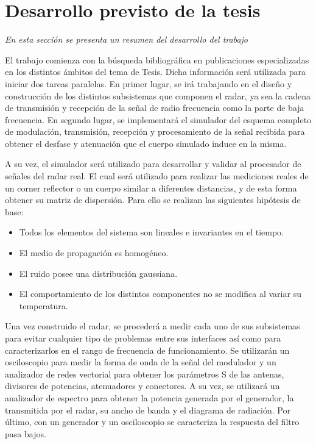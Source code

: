 \chapter{Desarrollo previsto de la tesis} \label{ch:development}

\textit{En esta sección se presenta un resumen del desarrollo del trabajo}

El trabajo comienza con la búsqueda bibliográfica en publicaciones especializadas en los distintos ámbitos del tema de Tesis. Dicha información será utilizada para iniciar dos tareas paralelas. En primer lugar, se irá trabajando en el diseño y construcción de los distintos subsistemas que componen el radar, ya sea la cadena de transmisión y recepción de la señal de radio frecuencia como la parte de baja frecuencia. En segundo lugar, se implementará el simulador del esquema completo de modulación, transmisión, recepción y procesamiento de la señal recibida para obtener el desfase y atenuación que el cuerpo simulado induce en la misma.

A su vez, el simulador será utilizado para desarrollar y validar al procesador de señales del radar real. El cual será utilizado para realizar las mediciones reales de un corner reflector o un cuerpo similar a diferentes distancias, y de esta forma obtener su matriz de dispersión. Para ello se realizan las siguientes hipótesis de base:

\begin{itemize}
    \item Todos los elementos del sistema son lineales e invariantes en el tiempo.
    \item El medio de propagación es homogéneo.
    \item El ruido posee una distribución gaussiana.
    \item El comportamiento de los distintos componentes no se modifica al variar su temperatura.
\end{itemize}

Una vez construido el radar, se procederá a medir cada uno de sus subsistemas para evitar cualquier tipo de problemas entre sus interfaces así como para caracterizarlos en el rango de frecuencia de funcionamiento. Se utilizarán un osciloscopio para medir la forma de onda de la señal del modulador y un analizador de redes vectorial para obtener los parámetros S de las antenas, divisores de potencias, atenuadores y conectores. A su vez, se utilizará un analizador de espectro para obtener la potencia generada por el generador, la transmitida por el radar, su ancho de banda y el diagrama de radiación. Por último, con un generador y un osciloscopio se caracteriza la respuesta del filtro pasa bajos. 

